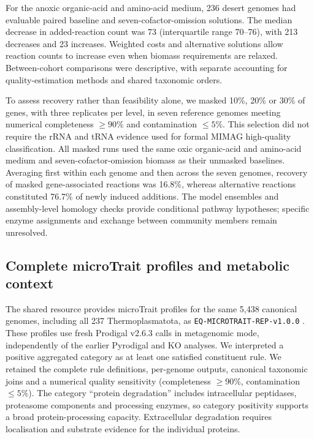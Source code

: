 For the anoxic organic-acid and amino-acid medium, 236 desert genomes had evaluable paired baseline and seven-cofactor-omission solutions. The median decrease in added-reaction count was 73 (interquartile range 70--76), with 213 decreases and 23 increases. Weighted costs and alternative solutions allow reaction counts to increase even when biomass requirements are relaxed. Between-cohort comparisons were descriptive, with separate accounting for quality-estimation methods and shared taxonomic orders.

To assess recovery rather than feasibility alone, we masked 10\%, 20\% or 30\% of genes, with three replicates per level, in seven reference genomes meeting numerical completeness $\geq90\%$ and contamination $\leq5\%$. This selection did not require the rRNA and tRNA evidence used for formal MIMAG high-quality classification. All masked runs used the same oxic organic-acid and amino-acid medium and seven-cofactor-omission biomass as their unmasked baselines. Averaging first within each genome and then across the seven genomes, recovery of masked gene-associated reactions was 16.8\%, whereas alternative reactions constituted 76.7\% of newly induced additions. The model ensembles and assembly-level homology checks provide conditional pathway hypotheses; specific enzyme assignments and exchange between community members remain unresolved.

\subsection*{Complete microTrait profiles and metabolic context}

The shared resource provides microTrait profiles for the same 5,438 canonical genomes, including all 237 Thermoplasmatota, as \texttt{EQ-MICROTRAIT-\allowbreak REP-\allowbreak v1.0.0} \citep{rubalkhali_datapaper,karaoz2022microtrait}. These profiles use fresh Prodigal v2.6.3 calls in metagenomic mode, independently of the earlier Pyrodigal and KO analyses. We interpreted a positive aggregated category as at least one satisfied constituent rule. We retained the complete rule definitions, per-genome outputs, canonical taxonomic joins and a numerical quality sensitivity (completeness $\geq90\%$, contamination $\leq5\%$). The category ``protein degradation'' includes intracellular peptidases, proteasome components and processing enzymes, so category positivity supports a broad protein-processing capacity. Extracellular degradation requires localisation and substrate evidence for the individual proteins.


